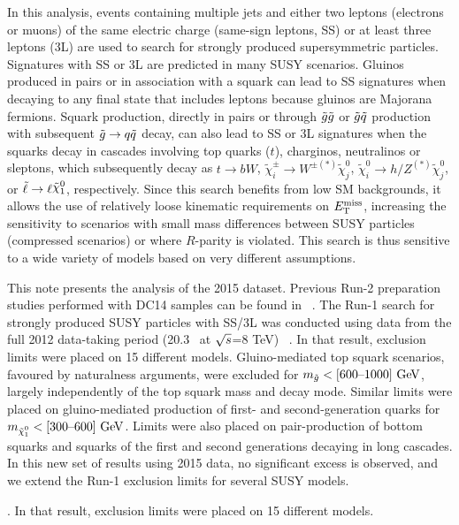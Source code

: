 In this analysis, events containing multiple jets and either two leptons (electrons or muons) 
of the same electric charge (same-sign leptons, SS) or at least three leptons (3L) 
are used to search for strongly produced 
supersymmetric particles. Signatures with SS or 3L are predicted in many SUSY scenarios.
Gluinos produced in pairs or in association with a squark  
can lead to SS signatures when decaying to any final state that includes leptons because gluinos are Majorana fermions.
Squark production, directly in pairs
or through $\tilde{g} \tilde{g}$ or $\tilde{g} \tilde q$  production with 
subsequent $\gluino \to q\tilde q$ decay, can also lead to
SS or 3L signatures when the squarks decay in cascades involving top quarks ($t$), charginos, 
neutralinos or sleptons, which subsequently decay as $t\to bW$,
$\tilde\chi^{\pm}_i\to W^{\pm (*)}\tilde\chi^0_j$,
$\tilde\chi^0_i\to h/Z^{(*)} \tilde\chi^0_j$, or
$\tilde\ell\to \ell\ninoone$, respectively.
Since this search benefits from low 
SM backgrounds, it allows the use of relatively loose kinematic
requirements on
$E_{\mathrm{T}}^{\mathrm{miss}}$, increasing the sensitivity to scenarios with
small mass differences between SUSY particles (compressed scenarios)
or where $R$-parity is violated. This search is thus sensitive to a wide variety 
of models based on very different assumptions.

This note presents the analysis of the 2015 dataset. 
Previous Run-2 preparation studies performed with DC14 samples can be found in~%
. 
The Run-1 search for strongly produced SUSY particles with SS/3L 
was conducted using data from the full 2012 data-taking period (20.3 \ifb\ at $\sqrt{s}$=8 TeV)~%
. 
In that result, exclusion limits were placed on 15 different models.
Gluino-mediated top squark scenarios, favoured by naturalness arguments, were excluded
for $m_{\gluino}<[600\mbox{--}1000] \GeV$, largely independently of the top
squark mass and decay mode. Similar limits were placed on gluino-mediated production of
first- and second-generation quarks for $m_{\ninoone}<[300\mbox{--}600] \GeV$. Limits were
also placed on pair-production  of bottom squarks and squarks of the first
and second generations decaying in long cascades. 
In this new set of results using 2015 data, no significant excess is observed, 
and we extend the Run-1 exclusion limits for several SUSY models. 

. In that result, exclusion limits were placed on 15 different models.

